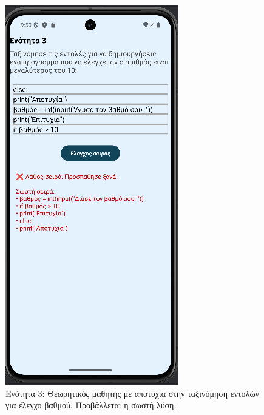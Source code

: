 \documentclass[11pt]{report}
\begin{document}
\begin{figure}[H]
\begin{minipage}[b]{0.45\textwidth}
  \end{minipage}
  \hfill
  \begin{minipage}[b]{0.45\textwidth}
    \includegraphics[width=\linewidth, height=0.35\textheight, keepaspectratio]{Figures/εικόνα (19).png}
    \caption{Ενότητα 3: Θεωρητικός μαθητής με αποτυχία στην ταξινόμηση εντολών για έλεγχο βαθμού. Προβάλλεται η σωστή λύση.}
  \end{minipage}
\end{figure}
\end{document}
